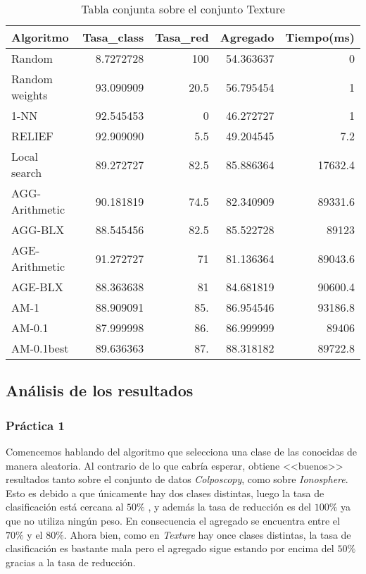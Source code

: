\documentclass[size=a4, parskip=half, titlepage=false, toc=flat, toc=bib, 12pt]{scrartcl}
\begin{document}
 \begin{table}[ht]
  \centering
  \begin{tabular}[t]{lrrrr}
  \toprule
  Algoritmo &Tasa\_class &Tasa\_red & Agregado & Tiempo(ms)\\
  \midrule
 Random             & 8.7272728 & 100 & 54.363637 & 0\\
 Random weights     & 93.090909 & 20.5 & 56.795454 & 1\\
 1-NN               & 92.545453 & 0 & 46.272727 & 1\\
 RELIEF             & 92.909090 & 5.5 & 49.204545 & 7.2\\
 Local search       & 89.272727 & 82.5 & 85.886364 & 17632.4\\
     AGG-Arithmetic& 90.181819 &     74.5 & 82.340909 & 89331.6 \\
     AGG-BLX& 88.545456 &     82.5 & 85.522728 &  89123 \\
     AGE-Arithmetic& 91.272727 &       71 & 81.136364 & 89043.6 \\
     AGE-BLX& 88.363638 &       81 & 84.681819 & 90600.4 \\
     AM-1& 88.909091 &      85. & 86.954546 & 93186.8 \\
     AM-0.1& 87.999998 &      86. & 86.999999 &  89406 \\
     AM-0.1best& 89.636363 &      87. & 88.318182 & 89722.8 \\
\bottomrule
  \end{tabular}
  \caption{Tabla conjunta sobre el conjunto Texture}
  \end{table}%

\newpage
\subsection{Análisis de los resultados}
\subsubsection{Práctica 1}
Comencemos hablando del algoritmo que selecciona una clase de las conocidas de manera aleatoria. Al contrario de lo que cabría esperar, obtiene <<buenos>> resultados tanto sobre el conjunto de datos \textit{Colposcopy}, como sobre \textit{Ionosphere}. Esto es debido a que únicamente hay dos clases distintas, luego la tasa de clasificación está cercana al $50\%$ , y además la tasa de reducción es del $100\%$ ya que no utiliza ningún peso. En consecuencia el agregado se encuentra entre el $70\%$ y el $80\%$. Ahora bien, como en \textit{Texture} hay once clases distintas, la tasa de clasificación es bastante mala pero el agregado sigue estando por encima del $50\%$ gracias a la tasa de reducción.
\end{document}
